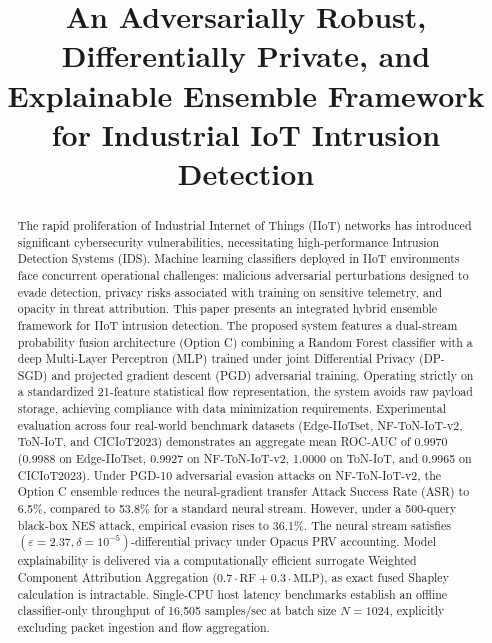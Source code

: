 \documentclass[10pt,journal,compsoc,twocolumn]{IEEEtran}
\begin{document}
\title{An Adversarially Robust, Differentially Private, and Explainable Ensemble Framework for Industrial IoT Intrusion Detection}


\maketitle

\begin{abstract}
The rapid proliferation of Industrial Internet of Things (IIoT) networks has introduced significant cybersecurity vulnerabilities, necessitating high-performance Intrusion Detection Systems (IDS). Machine learning classifiers deployed in IIoT environments face concurrent operational challenges: malicious adversarial perturbations designed to evade detection, privacy risks associated with training on sensitive telemetry, and opacity in threat attribution. This paper presents an integrated hybrid ensemble framework for IIoT intrusion detection. The proposed system features a dual-stream probability fusion architecture (Option C) combining a Random Forest classifier with a deep Multi-Layer Perceptron (MLP) trained under joint Differential Privacy (DP-SGD) and projected gradient descent (PGD) adversarial training. Operating strictly on a standardized 21-feature statistical flow representation, the system avoids raw payload storage, achieving compliance with data minimization requirements. Experimental evaluation across four real-world benchmark datasets (Edge-IIoTset, NF-ToN-IoT-v2, ToN-IoT, and CICIoT2023) demonstrates an aggregate mean ROC-AUC of 0.9970 (0.9988 on Edge-IIoTset, 0.9927 on NF-ToN-IoT-v2, 1.0000 on ToN-IoT, and 0.9965 on CICIoT2023). Under PGD-10 adversarial evasion attacks on NF-ToN-IoT-v2, the Option C ensemble reduces the neural-gradient transfer Attack Success Rate (ASR) to 6.5\%, compared to 53.8\% for a standard neural stream. However, under a 500-query black-box NES attack, empirical evasion rises to 36.1\%. The neural stream satisfies $(\varepsilon=2.37, \delta=10^{-5})$-differential privacy under Opacus PRV accounting. Model explainability is delivered via a computationally efficient surrogate Weighted Component Attribution Aggregation ($0.7 \cdot \text{RF} + 0.3 \cdot \text{MLP}$), as exact fused Shapley calculation is intractable. Single-CPU host latency benchmarks establish an offline classifier-only throughput of 16,505 samples/sec at batch size $N=1024$, explicitly excluding packet ingestion and flow aggregation.
\end{abstract}
\end{document}
